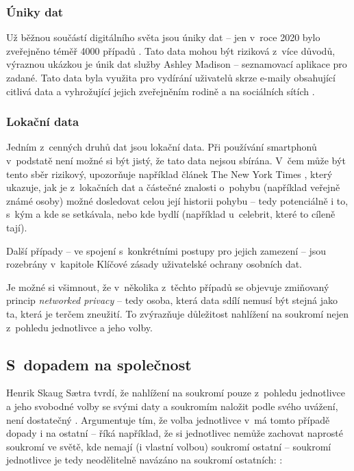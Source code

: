 \subsubsection*{Úniky dat}
Už běžnou součástí digitálního světa jsou úniky dat -- jen v~roce 2020 bylo zveřejněno téměř 4000 případů \citep{data-breaches-2021}. Tato data mohou být riziková z~více důvodů, výraznou ukázkou je únik dat služby Ashley Madison -- seznamovací aplikace pro zadané. Tato data byla využita pro vydírání uživatelů skrze e-maily obsahující citlivá data a vyhrožující jejich zveřejněním rodině a na sociálních sítích \citep{ashley-madison-leak}.

\subsubsection*{Lokační data}
Jedním z~cenných druhů dat jsou lokační data. Při používání smartphonů v~podstatě není možné si být jistý, že tato data nejsou sbírána. V~čem může být tento sběr rizikový, upozorňuje například článek The New York Times \citep{location-data}, který ukazuje, jak je z~lokačních dat a částečné znalosti o~pohybu (například veřejně známé osoby) možné dosledovat celou její historii pohybu -- tedy potenciálně i to, s~kým a kde se setkávala, nebo kde bydlí (například u~celebrit, které to cíleně tají).   

Další případy -- ve spojení s~konkrétními postupy pro jejich zamezení -- jsou rozebrány v~kapitole Klíčové zásady uživatelské ochrany osobních dat.

Je možné si všimnout, že v~několika z~těchto případů se objevuje zmiňovaný princip \textit{networked privacy} -- tedy osoba, která data sdílí nemusí být stejná jako ta, která je terčem zneužití. To zvýrazňuje důležitost nahlížení na soukromí nejen z~pohledu jednotlivce a jeho volby.

\subsection{S~dopadem na společnost}
Henrik Skaug Sætra tvrdí, že nahlížení na soukromí pouze z~pohledu jednotlivce a jeho svobodné volby se svými daty a soukromím naložit podle svého uvážení, není dostatečný \citep{privacy-as-aggregate-public-good}. Argumentuje tím, že volba jednotlivce v~má tomto případě dopady i na ostatní -- říká například, že si jednotlivec nemůže zachovat naprosté soukromí ve světě, kde nemají (i vlastní volbou) soukromí ostatní  -- soukromí jednotlivce je tedy neodělitelně navázáno na soukromí ostatních: 
:

